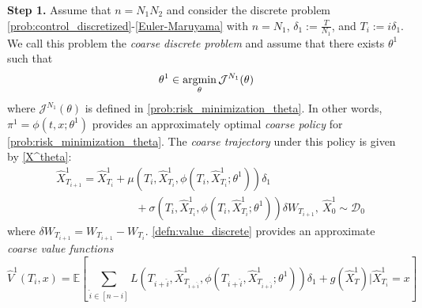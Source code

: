 \documentclass{article}
\numberwithin{equation}{section}
\begin{document}
\noindent\textbf{Step 1.} Assume that $n=N_1N_2$ and 
 consider the discrete problem \eqref{prob:control_discretized}-\eqref{Euler-Maruyama} with $n=N_1$, $\delta_1:= \frac{T}{N_1}$, and $T_{i}:=i\delta_1$. We call this problem the \emph{coarse discrete problem} and assume that there exists $\theta^1$ such that
 \begin{equation}\label{prob:coarse}
    \theta^1 \in\mathop{\text{\normalfont argmin}}_{\theta}\mathcal{J}^{N_1}(\theta)
\end{equation}
where $\mathcal{J}^{N_1}(\theta)$ is defined in \eqref{prob:risk_minimization_theta}. In other words, $\pi^1=\phi(t,x;\theta^1)$ provides an approximately optimal  \emph{coarse policy} for  \eqref{prob:risk_minimization_theta}. The \emph{coarse trajectory} under this policy is given by \eqref{X^theta}:
\begin{align}
   & \hat{X}^1_{T_{i+1}}=\hat{X}^1_{T_{i}}+\mu({T_{i}},\hat{X}^1_{T_{i}},\phi(T_{i},\hat{X}^1_{T_{i}};\theta^1))\delta_1\nonumber\\
   &\hspace{3cm}+\sigma({T_{i}},\hat{X}^1_{T_{i}},\phi(T_{i},\hat{X}^1_{T_{i}};\theta^1))\delta W_{{T_{i+1}}}, ~\hat{X}^1_0\sim\mathcal{D}_0\label{X^1}
\end{align}
where $\delta W_{{T_{i+1}}}=W_{{T_{i+1}}}-W_{{T_{i}}}$.  
\eqref{defn:value_discrete} provides
an approximate \emph{coarse value functions}
\begin{equation}\label{defn:value_^1}
    \hat{V}^1(T_{i},x)=\mathbb{E}\left[\sum_{\hat{i}\in[n-i]}\!\!\!\!L(T_{i+\hat{i}},\hat{X}^{1}_{T_{i+\hat{i}}},\phi(T_{i+\hat{i}},\hat{X}^1_{T_{i+\hat{i}}};\theta^1))\delta_1 + g(\hat{X}^1_T)\bigg|\hat{X}^1_{T_i}=x\right]
\end{equation}
\end{document}
